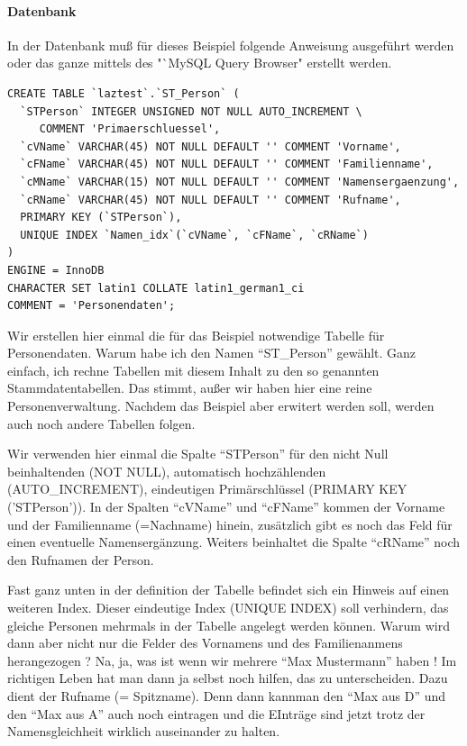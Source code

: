 \paragraph{Datenbank}
In der Datenbank muß für dieses Beispiel folgende Anweisung ausgeführt werden oder das ganze mittels des "`MySQL Query Browser" erstellt werden.
\begin{verbatim}
CREATE TABLE `laztest`.`ST_Person` (
  `STPerson` INTEGER UNSIGNED NOT NULL AUTO_INCREMENT \
     COMMENT 'Primaerschluessel',
  `cVName` VARCHAR(45) NOT NULL DEFAULT '' COMMENT 'Vorname',
  `cFName` VARCHAR(45) NOT NULL DEFAULT '' COMMENT 'Familienname',
  `cMName` VARCHAR(15) NOT NULL DEFAULT '' COMMENT 'Namensergaenzung',
  `cRName` VARCHAR(45) NOT NULL DEFAULT '' COMMENT 'Rufname',
  PRIMARY KEY (`STPerson`),
  UNIQUE INDEX `Namen_idx`(`cVName`, `cFName`, `cRName`)
)
ENGINE = InnoDB
CHARACTER SET latin1 COLLATE latin1_german1_ci
COMMENT = 'Personendaten';
\end{verbatim}
Wir erstellen hier einmal die für das Beispiel notwendige Tabelle für Personendaten. 
\label{fig:MySQLSimple02}
Warum habe ich den Namen "`ST\_Person"' gewählt. Ganz einfach, ich rechne Tabellen mit diesem Inhalt zu den so genannten Stammdatentabellen. Das stimmt, außer wir haben hier eine reine Personenverwaltung. Nachdem das Beispiel aber erwitert werden soll, werden auch noch andere Tabellen folgen. 

Wir verwenden hier einmal die Spalte "`STPerson"' für den nicht Null  beinhaltenden (NOT NULL), automatisch hochzählenden (AUTO\_INCREMENT), eindeutigen Primärschlüssel (PRIMARY KEY ('STPerson')). In der Spalten "`cVName"' und "`cFName"' kommen der Vorname und der Familienname (=Nachname) hinein, zusätzlich gibt es noch das Feld für einen eventuelle Namensergänzung. Weiters beinhaltet die Spalte "`cRName"' noch den Rufnamen der Person.

Fast ganz unten in der definition der Tabelle befindet sich ein Hinweis auf einen weiteren Index. Dieser eindeutige Index (UNIQUE INDEX) soll verhindern, das gleiche Personen mehrmals in der Tabelle angelegt werden können. Warum wird dann aber nicht nur die Felder des Vornamens und des Familienanmens herangezogen ? Na, ja, was ist wenn wir mehrere "`Max Mustermann"' haben ! Im richtigen Leben hat man dann ja selbst noch hilfen, das zu unterscheiden. Dazu dient der Rufname (= Spitzname). Denn dann kannman den "`Max aus D"' und den "`Max aus A"' auch noch eintragen und die EInträge sind jetzt trotz der Namensgleichheit wirklich auseinander zu halten.

